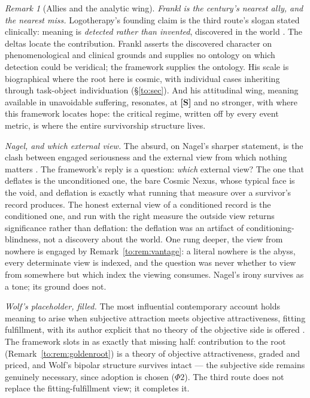 \documentclass[11pt]{article}
\numberwithin{equation}{section}
\theoremstyle{plain}
\theoremstyle{definition}
\theoremstyle{remark}
\newtheorem{remark}[theorem]{Remark}
\begin{document}
\begin{remark}[Allies and the analytic wing]\label{gs:rem:meaningallies}
\emph{Frankl is the century's nearest ally, and the nearest miss.}
Logotherapy's founding claim is the third route's slogan stated
clinically: meaning is \emph{detected rather than invented},
discovered in the world \cite{Frankl59}. The deltas locate the
contribution. Frankl asserts the discovered character on
phenomenological and clinical grounds and supplies no ontology on
which detection could be veridical; the framework supplies the
ontology. His scale is biographical where the root here is cosmic,
with individual cases inheriting through task-object individuation
(\S\ref{to:sec}). And his attitudinal wing, meaning available in
unavoidable suffering, resonates, at \textbf{[S]} and no
stronger, with where this framework locates hope: the critical
regime, written off by every event metric, is where the entire
survivorship structure lives.

\emph{Nagel, and which external view.} The absurd, on Nagel's
sharper statement, is the clash between engaged seriousness and the
external view from which nothing matters \cite{Nagel71}. The
framework's reply is a question: \emph{which} external view? The one
that deflates is the unconditioned one, the bare Cosmic Nexus,
whose typical face is the void, and deflation is exactly what
running that measure over a survivor's record produces. The honest
external view of a conditioned record is the conditioned one, and
run with the right measure the outside view returns significance
rather than deflation: the deflation was an artifact of
conditioning-blindness, not a discovery about the world. One rung
deeper, the view from nowhere is engaged by
Remark~\ref{to:rem:vantage}: a literal nowhere is the abyss, every
determinate view is indexed, and the question was never whether to
view from somewhere but which index the viewing consumes. Nagel's
irony survives as a tone; its ground does not.

\emph{Wolf's placeholder, filled.} The most influential
contemporary account holds meaning to arise when subjective
attraction meets objective attractiveness, fitting fulfillment, with its author explicit that no theory of the objective side is
offered \cite{Wolf10}. The framework slots in as exactly that
missing half: contribution to the root
(Remark~\ref{to:rem:goldenroot}) is a theory of objective
attractiveness, graded and priced, and Wolf's bipolar structure
survives intact --- the subjective side remains genuinely necessary,
since adoption is chosen ($\Phi2$). The third route does not replace
the fitting-fulfillment view; it completes it.


\end{remark}
\end{document}
